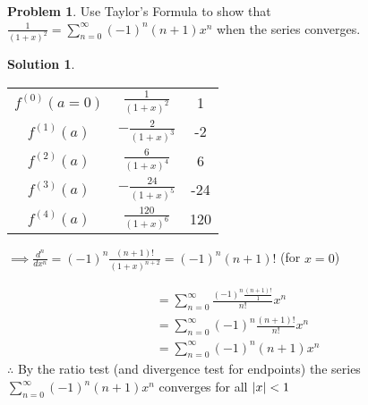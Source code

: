 \documentclass[10pt]{article}
\theoremstyle{definition}
\newtheorem{problem}{Problem}
\newtheorem{soln}{Solution}
\begin{document}
\begin{problem}
Use Taylor's Formula to show that $\displaystyle \frac{1}{(1+x)^2}=\sum_{n = 0}^{\infty} (-1)^n(n+1)x^n$ when the series converges.
\end{problem}
\begin{soln} ~\\
      \begin{center}
            \begin{tabular}{ c | c | c }
                  $f^{(0)}(a=0)$ & $\frac{1}{(1+x)^2}$   & 1   \\
                  $f^{(1)}(a)$   & $-\frac{2}{(1+x)^3}$  & -2  \\
                  $f^{(2)}(a)$   & $\frac{6}{(1+x)^4}$   & 6   \\
                  $f^{(3)}(a)$   & $-\frac{24}{(1+x)^5}$ & -24 \\
                  $f^{(4)}(a)$   & $\frac{120}{(1+x)^6}$ & 120
            \end{tabular}
            $\implies\displaystyle \frac{d^n}{dx^n}=(-1)^n\frac{(n+1)!}{(1+x)^{n+2}}=(-1)^n(n+1)!$ (for $x=0$)
      \end{center}
      \begin{align*}
             & = \sum_{n=0}^{\infty} \frac{(-1)^n\frac{(n+1)!}{1}}{n!}x^n \\
             & = \sum_{n=0}^{\infty} (-1)^n\frac{(n+1)!}{n!}x^n           \\
             & = \sum_{n=0}^{\infty} (-1)^n(n+1)x^n
      \end{align*}
      \noindent $\therefore$ By the ratio test (and divergence test for endpoints) the series $\displaystyle \sum_{n = 0}^{\infty} (-1)^n(n+1)x^n$ converges for all $\abs{x}<1$
\end{soln}
\end{document}
